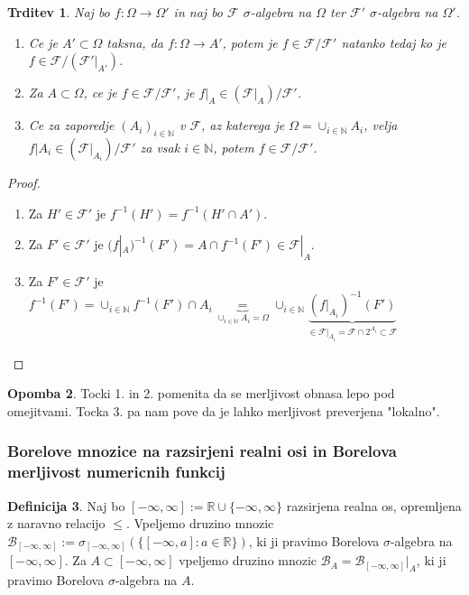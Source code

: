 \documentclass[a4paper,12pt]{article}
\theoremstyle{definition} %
\newtheorem{definicija}{Definicija}[section]
\newtheorem{opomba}[definicija]{Opomba}
\theoremstyle{plain} %
\newtheorem{trditev}[definicija]{Trditev}
\newcommand{\R}{\mathbb{R}}
\newcommand{\N}{\mathbb{N}}
\newcommand{\F}{\mathcal{F}}
\begin{document}
            \begin{trditev}
                Naj bo $f:\Omega \rightarrow \Omega'$ in naj bo $\F$ $\sigma$-algebra na $\Omega$ ter $\F'$ $\sigma$-algebra na $\Omega'$.
                \begin{enumerate}
                    \item Ce je $A' \subset \Omega$ taksna, da $f:\Omega \rightarrow A'$, potem je $f \in \F/\F'$ natanko tedaj ko je $f \in \F/(\F'|_{A'})$.
                    \item Za $A \subset \Omega$, ce je $f \in \F/\F'$, je $f|_{A} \in (\F|_A)/\F'$.
                    \item Ce za zaporedje $(A_i)_{i \in \N}$ v $\F$, az katerega je $\Omega = \cup_{i \in \N}A_i$, velja $f|A_{i} \in (\F|_{A_{i}})/\F'$ za vsak $i \in \N$, potem $f \in \F/\F'$.
                \end{enumerate}
            \end{trditev}

            \begin{proof}
                \begin{enumerate}
                    \item Za $H'\in \F'$ je $f^{-1}(H') = f^{-1}(H'\cap A').$
                    \item Za $F' \in \F'$ je $(f|_A)^{-1}(F') = A \cap f^{-1}(F') \in \F|_A$.
                    \item Za $F'\in \F'$ je $f^{-1}(F') = \cup_{i \in \N}f^{-1}(F')\cap A_i \underbrace{=}_{\cup_{i \in \N}A_i = \Omega} \cup_{i \in \N}\underbrace{(f|_{A_i})^{-1}(F')}_{\in \F|_{A_i} = \F\cap 2^{A_i} \subset \F}$
                \end{enumerate}
            \end{proof}

            \begin{opomba}
                Tocki 1. in 2. pomenita da se merljivost obnasa lepo pod omejitvami. Tocka 3. pa nam pove da je lahko merljivost preverjena "lokalno". 
            \end{opomba}

        \subsubsection{Borelove mnozice na razsirjeni realni osi in Borelova merljivost numericnih funkcij}   
            \begin{definicija}
                Naj bo $[-\infty, \infty] := \R \cup \{-\infty, \infty\}$ razsirjena realna os, opremljena z naravno relacijo $\leq$. Vpeljemo druzino mnozic $\mathcal{B}_{[-\infty, \infty]}:= \sigma_{[-\infty, \infty]}(\{[-\infty, a]:a \in \R\})$, ki ji pravimo Borelova $\sigma$-algebra na $[-\infty, \infty]$. Za $A \subset [-\infty, \infty]$ vpeljemo druzino mnozic $\mathcal{B}_A = \mathcal{B}_{[-\infty, \infty]}|_A$, ki ji pravimo Borelova $\sigma$-algebra na $A$. 
            \end{definicija}
\end{document}
